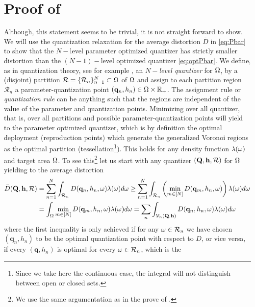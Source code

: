 \documentclass[smallabstract,smallcaptions]{dccpaper}
\newcounter{example}[section]
\renewcommand{\vp}{\mathbf q}
\renewcommand{\vP}{\mathbf Q}
\newcommand{\Vor}{\ensuremath{\mathcal{V}}}         %
\newcommand{\Rset}{\ensuremath{\mathcal R}}
\newcommand{\Dis}{\ensuremath{D}}                    %
\newcommand{\AvDis}{\ensuremath{\bar{\Dis}}}         %
\begin{document}
\section{Proof of }\label{app:proof_lemma_active}
  Although, this statement seems to be trivial, it is not straight forward to show.
  We will use the quantization relaxation for the average distortion $\AvDis$
  in \eqref{eq:Pbar} to  show that the $N-$level parameter optimized quantizer has strictly smaller distortion than the
  $(N-1)-$level optimized quantizer \eqref{eq:optPbar}. We define, as in
  quantization theory, see for example \cite{GN98}, an \emph{$N-$level quantizer} for $\Omega$, by a (disjoint) partition
  $\Rset=\{\Rset_n\}_{n=1}^N\subset \Ome$ of $\Omega$ and assign to each partition region $\Rset_n$ a
  parameter-quantization point
  $(\vp_n,h_n)\in\Ome\times\R_+$. The assignment rule or \emph{quantization rule} can be anything such that the regions
  are independent of the value of the parameter and quantization points.  Minimizing over all quantizer, that is, over
  all partitions and possible parameter-quantization points will yield to the parameter optimized quantizer, which is by definition the
  optimal deployment (reproduction points) which generate the generalized Voronoi regions as the optimal partition
  (tessellation\footnote{Since we take here the continuous case, the integral will not distinguish between open or closed
  sets.}). This holds for any density function $\lambda(\omega)$ and target area $\Omega$.  To see this\footnote{We use the
    same argumentation as in the prove of \cite[Prop.1]{Erdem}.} let us start with any quantizer $(\vP,\vh,\Rset)$ for
    $\Omega$ yielding to the average distortion 
  \begin{align}
    \AvDis(\vP,\vh,\Rset) &=\sum_{n=1}^N \int_{\Rset_n} \Dis(\vp_n,h_n,\ome)\lam(\ome) d\ome \geq \sum_{n=1}^N \int_{\Rset_n} 
    \left(\min_{m\in[N]} \Dis(\vp_m,h_n,\ome) \right) \lam(\ome)d\ome\notag\\
    &=\int_{\Ome} \min_{m\in[N]} \Dis(\vp_m,h_n,\ome) \lam(\ome)d\ome
    =\sum_n \int_{\Vor_n(\vP,\vh)} \Dis(\vp_n,h_n,\ome) \lam(\ome)d\ome
  \end{align} 
  where the first inequality is only achieved if for any $\ome\in \Rset_n$ we have chosen $(\vp_n,h_n)$ to be the optimal
  quantization point with respect to $\Dis$, or vice versa, if every $(\vp,h_n)$ is optimal for every $\ome\in \Rset_n$, which is the
\end{document}
